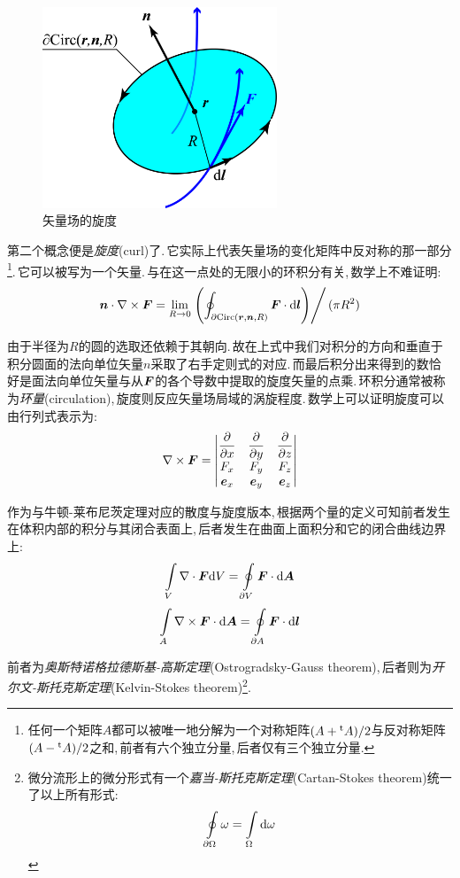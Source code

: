 \begin{figure}
\centering
\vspace{0.5cm}
\includegraphics[width=7cm]{image/7-1-5.png}
\caption{矢量场的旋度}
\end{figure}
第二个概念便是\emph{旋度}(curl)了.\,它实际上代表矢量场的变化矩阵中反对称的那一部分\footnote{任何一个矩阵$A$都可以被唯一地分解为一个对称矩阵$(A+{}^{\rm t}A)/2$与反对称矩阵$(A-{}^{\rm t}A)/2$之和,\,前者有六个独立分量,\,后者仅有三个独立分量.}.\,它可以被写为一个矢量.\,与在这一点处的无限小的环积分有关,\,数学上不难证明:
\[\boldsymbol{n}\cdot\nabla\times \boldsymbol{F}=\lim_{R\to 0}\left.\left(\oint_{\partial {\rm Circ}(\boldsymbol{r},\boldsymbol{n},R)}\boldsymbol{F}\cdot \textrm{d}\boldsymbol{l}\right)\right/(\pi R^2)\]

由于半径为$R$的圆的选取还依赖于其朝向.\,故在上式中我们对积分的方向和垂直于积分圆面的法向单位矢量$n$采取了右手定则式的对应.\,而最后积分出来得到的数恰好是面法向单位矢量与从$\boldsymbol{F}$的各个导数中提取的旋度矢量的点乘.\,环积分通常被称为\emph{环量}(circulation),\,旋度则反应矢量场局域的涡旋程度.\,数学上可以证明旋度可以由行列式表示为:
\[\nabla\times \boldsymbol{F}=\begin{vmatrix}
\dfrac{\partial}{\partial x}&\dfrac{\partial}{\partial y}&\dfrac{\partial}{\partial z}\\
F_x&F_y&F_z\\
\boldsymbol{e}_x&\boldsymbol{e}_y&\boldsymbol{e}_z
\end{vmatrix}\]

作为与牛顿-莱布尼茨定理对应的散度与旋度版本,\,根据两个量的定义可知前者发生在体积内部的积分与其闭合表面上,\,后者发生在曲面上面积分和它的闭合曲线边界上:
\[\int\limits_V \nabla\cdot \boldsymbol{F}\textrm{d} V=\oint\limits_{\partial V}\boldsymbol{F}\cdot\textrm{d}\boldsymbol{A}\]
\[\int\limits_A \nabla\times \boldsymbol{F}\cdot\textrm{d} \boldsymbol{A}=\oint\limits_{\partial A}\boldsymbol{F}\cdot\textrm{d}\boldsymbol{l}\]

前者为\emph{奥斯特诺格拉德斯基-高斯定理}(Ostrogradsky-Gauss theorem),\,后者则为\emph{开尔文-斯托克斯定理}(Kelvin-Stokes theorem)\footnote{微分流形上的微分形式有一个\emph{嘉当-斯托克斯定理}(Cartan-Stokes theorem)统一了以上所有形式:
\[\oint\limits_{\partial \Omega}\omega=\int\limits_\Omega \textrm{d} \omega\]}.

